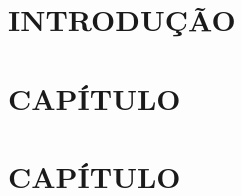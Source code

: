 
\chapter{INTRODUÇÃO} \label{ch:introduction} 


\chapter{CAPÍTULO} \label{ch:chapter2} 


\chapter{CAPÍTULO} \label{ch:chapter3}

